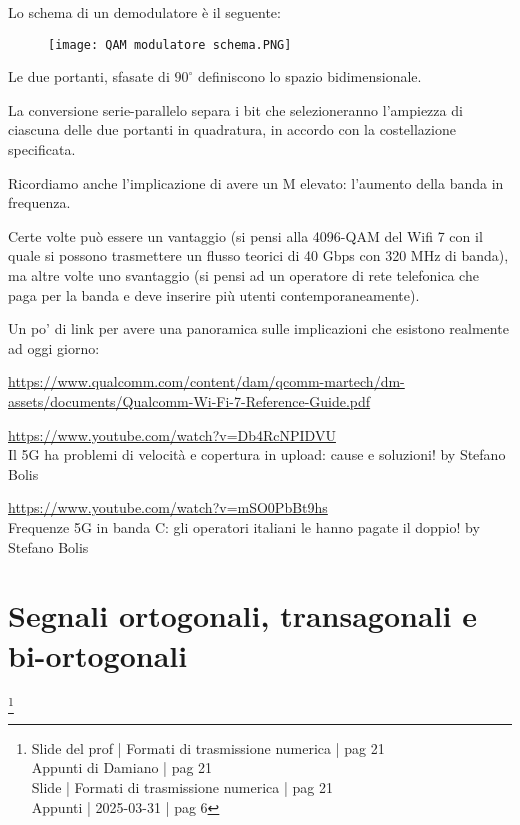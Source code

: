 Lo schema di un demodulatore è il seguente: 

\begin{figure}[h]
    \centering
    \texttt{[image: QAM modulatore schema.PNG]}
\end{figure}

Le due portanti, sfasate di $90^{\circ}$ definiscono lo spazio bidimensionale. \newline 

La conversione serie-parallelo separa i bit che selezioneranno l'ampiezza di ciascuna delle due portanti in quadratura, in accordo con la costellazione specificata. \newline 


\begin{tcolorbox}
    Ricordiamo anche l'implicazione di avere un M elevato: l'aumento della banda in frequenza. \newline 

    Certe volte può essere un vantaggio (si pensi alla 4096-QAM del Wifi 7 con il quale si possono trasmettere un flusso teorici di 40 Gbps con 320 MHz di banda), 
    ma altre volte uno svantaggio (si pensi ad un operatore di rete telefonica che paga per la banda e deve inserire più utenti contemporaneamente). \newline 

    Un po' di link per avere una panoramica sulle implicazioni che esistono realmente ad oggi giorno: \newline 

    \url{https://www.qualcomm.com/content/dam/qcomm-martech/dm-assets/documents/Qualcomm-Wi-Fi-7-Reference-Guide.pdf} \newline 

    \url{https://www.youtube.com/watch?v=Db4RcNPIDVU} \\
    Il 5G ha problemi di velocità e copertura in upload: cause e soluzioni! by Stefano Bolis \newline 

    \url{https://www.youtube.com/watch?v=mSO0PbBt9hs} \\
    Frequenze 5G in banda C: gli operatori italiani le hanno pagate il doppio! by Stefano Bolis 

\end{tcolorbox}

\newpage 

\section{Segnali ortogonali, transagonali e bi-ortogonali}
\footnote{Slide del prof | Formati di trasmissione numerica | pag 21 \\  
Appunti di Damiano | pag 21 \\
Slide | Formati di trasmissione numerica | pag  21\\
Appunti | 2025-03-31 | pag 6 
}

